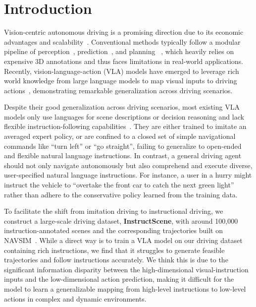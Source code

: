 \section{Introduction}
\label{sec: intro}
Vision-centric autonomous driving is a promising direction due to its economic advantages and scalability~\cite{bevformer, tpvformer, surroundocc, occ3d, uniad, vad}. 
Conventional methods typically follow a modular pipeline of perception~\cite{bevdet, bevfusion, gaussianformer, gaussianformer2, quadricformer}, prediction~\cite{occworld, occllama, gaussianworld, doe-1}, and planning ~\cite{uniad, vad, genad, vadv2, gaussianad}, which heavily relies on expensive 3D annotations and thus faces limitations in real-world applications. 
Recently, vision-language-action (VLA) models have emerged to leverage rich world knowledge from large language models to map visual inputs to driving actions~\cite{omnidrive, emma, openemma, orion}, demonstrating remarkable generalization across driving scenarios.

Despite their good generalization across driving scenarios, most existing VLA models only use languages for scene descriptions or decision reasoning and lack flexible instruction-following capabilities~\cite{opendrivevla, orion, autovla, drivemoe, recogdrive}.
They are either trained to imitate an averaged expert policy, or are confined to a closed set of simple navigational commands like ``turn left'' or ``go straight'', failing to generalize to open-ended and flexible natural language instructions.
In contrast, a general driving agent should not only navigate autonomously but also comprehend and execute diverse, user-specified natural language instructions. 
For instance, a user in a hurry might instruct the vehicle to ``overtake the front car to catch the next green light'' rather than adhere to the conservative policy learned from the training data. 

To facilitate the shift from imitation driving to instructional driving, we construct a large-scale driving dataset, \textbf{InstructScene}, with around 100,000 instruction-annotated scenes and the corresponding trajectories built on NAVSIM~\cite{navsim-v1}. 
While a direct way is to train a VLA model on our driving dataset containing rich instructions, we find that it struggles to generate feasible trajectories and follow instructions accurately.
We think this is due to the significant information disparity between the high-dimensional visual-instruction inputs and the low-dimensional action prediction, making it difficult for the model to learn a generalizable mapping from high-level instructions to low-level actions in complex and dynamic environments. 

